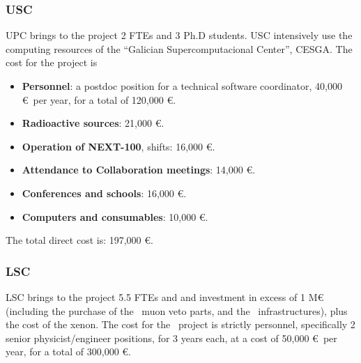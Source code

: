 \subsubsection{USC}
UPC brings to the project 2 FTEs and 3 Ph.D students. USC intensively use the computing resources of the ``Galician Supercomputacional Center'', CESGA. The cost for the \sUSC project is

\begin{itemize}[noitemsep,topsep=0pt,parsep=0pt,partopsep=0pt]
    \item {\bf Personnel}: a postdoc position for a technical software coordinator, 40,000 \euro\ per year, for a total of 120,000 \euro.
    \item {\bf Radioactive sources}: 21,000 \euro.
    \item {\bf Operation of NEXT-100}, shifts: 16,000 \euro.
    \item {\bf Attendance to Collaboration meetings}: 14,000 \euro.
    \item {\bf Conferences and schools}:  16,000 \euro.
    \item {\bf Computers and consumables}: 10,000 \euro.
\end{itemize}

The total direct cost is: 197,000 \euro.
\subsubsection{LSC}

LSC brings to the project 5.5 FTEs and and investment in excess of 1 M\euro (including the purchase of the \Next\ muon veto parts, and the \NHD\ infrastructures), plus the cost of the xenon. The cost for the \sLSC\ project is strictly personnel, specifically 2 senior physicist/engineer positions, for 3 years each, at a cost of 
50,000 \euro\ per year, for a total of 300,000 \euro.
 
